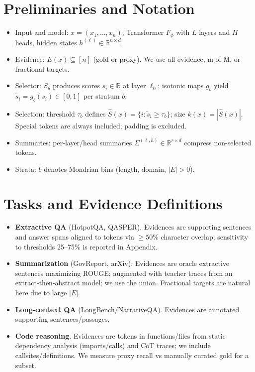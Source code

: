 \documentclass[11pt]{article}
\begin{document}
\section{Preliminaries and Notation}
\begin{itemize}
\item Input and model: $x=(x_1,\dots,x_n)$, Transformer $F_\phi$ with $L$ layers and $H$ heads, hidden states $h^{(\ell)}\in\mathbb{R}^{n\times d}$.
\item Evidence: $E(x)\subseteq[n]$ (gold or proxy). We use all-evidence, m-of-M, or fractional targets.
\item Selector: $S_\theta$ produces scores $s_i\in\mathbb{R}$ at layer $\ell_0$; isotonic maps $g_b$ yield $\tilde{s}_i=g_b(s_i)\in[0,1]$ per stratum $b$.
\item Selection: threshold $\tau_b$ defines $\hat{S}(x)=\{i:\tilde{s}_i\geq\tau_b\}$; size $k(x)=|\hat{S}(x)|$. Special tokens are always included; padding is excluded.
\item Summaries: per-layer/head summaries $\Sigma^{(\ell,h)}\in\mathbb{R}^{r\times d}$ compress non-selected tokens.
\item Strata: $b$ denotes Mondrian bins (length, domain, $|E|>0$).
\end{itemize}

\section{Tasks and Evidence Definitions}
\begin{itemize}
\item \textbf{Extractive QA} (HotpotQA, QASPER). Evidences are supporting sentences and answer spans aligned to tokens via $\geq 50\%$ character overlap; sensitivity to thresholds 25--75\% is reported in Appendix.
\item \textbf{Summarization} (GovReport, arXiv). Evidences are oracle extractive sentences maximizing ROUGE; augmented with teacher traces from an extract-then-abstract model; we use the union. Fractional targets are natural here due to large $|E|$.
\item \textbf{Long-context QA} (LongBench/NarrativeQA). Evidences are annotated supporting sentences/passages.
\item \textbf{Code reasoning}. Evidences are tokens in functions/files from static dependency analysis (imports/calls) and CoT traces; we include callsites/definitions. We measure proxy recall vs manually curated gold for a subset.
\end{itemize}
\end{document}
